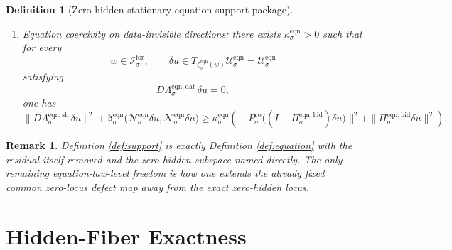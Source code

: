 \documentclass[11pt]{article}
\newcommand{\ForSpace}[1]{\mathcal I_{#1}^{\mathrm{for}}}
\newcommand{\Kernel}[1]{K_{#1}^{0}}
\newcommand{\StateComp}[1]{P_{#1}^{\mathrm{co}}}
\newcommand{\EqnSpace}[1]{\mathcal U_{#1}^{\mathrm{eqn}}}
\newcommand{\EqnData}[1]{\Lambda_{#1}^{\mathrm{eqn,dat}}}
\newcommand{\EqnShell}[1]{\Lambda_{#1}^{\mathrm{eqn,sh}}}
\newcommand{\EqnPair}[1]{\mathfrak b_{#1}^{\mathrm{eqn}}}
\newcommand{\EqnZero}[1]{V_{#1}^{\mathrm{eqn},0}}
\newcommand{\EqnProj}[1]{\Pi_{#1}^{\mathrm{eqn,hid}}}
\newcommand{\EqnLin}[1]{\mathcal N_{#1}^{\mathrm{eqn}}}
\newcommand{\EqnEmbed}[1]{\zeta_{#1}^{\mathrm{eqn}}}
\newtheorem{definition}{Definition}
\newtheorem{remark}{Remark}
\begin{document}
\begin{definition}[Zero-hidden stationary equation support package]
\begin{enumerate}
\[    \]
    and the orthogonal projector
    \[
    \StateComp{\sigma}:
    \EqnZero{\sigma}\to
    {\Kernel{\sigma}}^{\perp}\cap\EqnZero{\sigma}.
    \]
    \item Equation coercivity on data-invisible directions: there exists \(\kappa_{\sigma}^{\mathrm{eqn}}>0\) such that for every
    \[
    w\in\ForSpace{\sigma},
    \qquad
    \delta u\in T_{\EqnEmbed{\sigma}(w)}\EqnSpace{\sigma}=\EqnSpace{\sigma}
    \]
    satisfying
    \[
    D\EqnData{\sigma}\,\delta u=0,
    \]
    one has
    \begin{equation}
    \|D\EqnShell{\sigma}\,\delta u\|^{2}
    +
    \EqnPair{\sigma}\bigl(\EqnLin{\sigma}\delta u,\EqnLin{\sigma}\delta u\bigr)
    \ge
    \kappa_{\sigma}^{\mathrm{eqn}}
    \left(
    \|\StateComp{\sigma}\bigl((I-\EqnProj{\sigma})\delta u\bigr)\|^{2}
    +
    \|\EqnProj{\sigma}\delta u\|^{2}
    \right).
    \label{eq:supportcoercive}
    \end{equation}
\end{enumerate}
\end{definition}

\begin{remark}
Definition \ref{def:support} is exactly Definition \ref{def:equation} with the residual itself removed and the zero-hidden subspace named directly. The only remaining equation-law-level freedom is how one extends the already fixed common zero-locus defect map away from the exact zero-hidden locus.
\end{remark}

\section{Hidden-Fiber Exactness}
\end{document}
